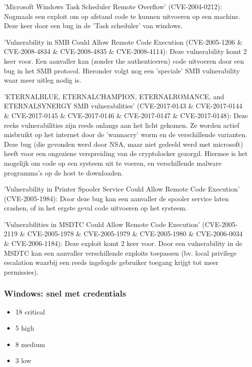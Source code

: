 'Microsoft Windows Task Scheduler Remote Overflow' (CVE-2004-0212): Nogmaals een exploit om op afstand code te kunnen uitvoeren op een machine. Deze keer door een bug in de 'Task scheduler' van windows.

'Vulnerability in SMB Could Allow Remote Code Execution (CVE-2005-1206 \& CVE-2008-4834 \& CVE-2008-4835 \& CVE-2008-4114): Deze vulnerability komt 2 keer voor. Een aanvaller kan (zonder the authenticeren) code uitvoeren door een bug in het SMB protocol. Hieronder volgt nog een 'speciale' SMB vulnerability waar meer uitleg nodig is.

'ETERNALBLUE, ETERNALCHAMPION, ETERNALROMANCE, and ETERNALSYNERGY SMB vulnerabilities' (CVE-2017-0143 \& CVE-2017-0144 \& CVE-2017-0145 \& CVE-2017-0146 \& CVE-2017-0147 \& CVE-2017-0148): Deze reeks vulnerabilities zijn reeds onlangs aan het licht gekomen. Ze worden actief misbruikt op het internet door de 'wannacry' worm en de verschillende varianten. Deze bug (die gevonden werd door NSA, maar niet gedeeld werd met microsoft) heeft voor een ongeziene verspreiding van de cryptolocker gezorgd. Hiermee is het mogelijk om code op een systeem uit te voeren, en verschillende malware programma's op de host te downloaden. 

'Vulnerability in Printer Spooler Service Could Allow Remote Code Execution' (CVE-2005-1984): Door deze bug kan een aanvaller de spooler service laten crashen, of in het ergste geval code uitvoeren op het systeem.

'Vulnerabilities in MSDTC Could Allow Remote Code Execution' (CVE-2005-2119 \& CVE-2005-1978 \& CVE-2005-1979 \& CVE-2005-1980 \& CVE-2006-0034 \& CVE-2006-1184): Deze exploit komt 2 keer voor. Door een vulnerability in de MSDTC kan een aanvaller verschillende exploits toepassen (bv. local privilege escalation waarbij een reeds ingelogde gebruiker toegang krijgt tot meer permissies).
 
\subsubsection{Windows: snel met credentials}

\begin{itemize}
\item 18 critical
\item 5 high
\item 8 medium
\item 3 low
\end{itemize}

